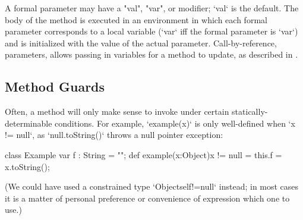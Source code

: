 
A formal parameter may have a \xcd"val", \xcd"var", or 
modifier; \xcd`val` is the default.
The body of the method is executed in an environment in which 
each formal parameter corresponds to a local variable (\xcd`var` iff the
formal parameter is \xcd`var`)
and is initialized with the value of the actual parameter.
Call-by-reference,  parameters, allows passing in variables for a
method to update, as described in . 


\subsection{Method Guards}
\label{MethodGuard}

Often, a method will only make sense to invoke under certain
statically-determinable conditions.  For example, \xcd`example(x)` is only
well-defined when \xcd`x != null`, as \xcd`null.toString()` throws a null
pointer exception: 
\begin{xten}
class Example {
   var f : String = "";
   def example(x:Object){x != null} = {
      this.f = x.toString();
   }
}
\end{xten}
%
\noindent
(We could have used a constrained type \xcd`Object{self!=null}` instead; in
most cases it is a matter of personal preference or convenience of expression
which one to use.) 

